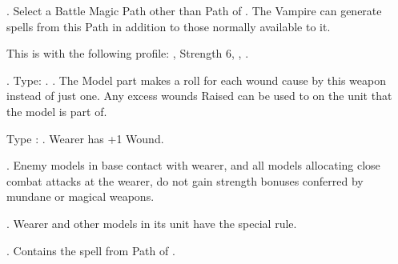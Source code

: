  \textbf{\bloodlinepower}. Select a Battle Magic Path other than Path of \nature . The Vampire can generate spells from this Path in addition to those normally available to it.

\endpricelist

\armymagicitems

\armymagicweapons

\startpricelist

 This is \boltthrower \artilleryweapon with the following profile: , Strength 6, , .

 . Type: \hw . . The Model part makes a \vampiric{} roll for each  wound cause by this weapon instead of just one. Any excess wounds Raised can be used to \raisewounds on the unit that the model is part of.

\endpricelist

\armymagicarmor

\startpricelist

 Type : \platearmour . Wearer has +1 Wound.

\endpricelist

\armytalismans

\startpricelist

 . Enemy models in base contact with wearer, and all models allocating close combat attacks at the wearer, do not gain strength bonuses  conferred by mundane or magical weapons.

\endpricelist

\armyenchanteditems

\startpricelist

 . Wearer and other \rnf models in its unit have the \distracting special rule.

\endpricelist

\armyarcaneitems

\startpricelist

 . Contains the spell \necromancyspelltwo from Path of \necromancy .

